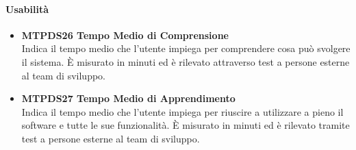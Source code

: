\paragraph{Usabilità}

\begin{itemize}

	\item\textbf{MTPDS26 Tempo Medio di Comprensione}\-\\
Indica il tempo medio che l'utente impiega per comprendere cosa può svolgere il sistema. È misurato in minuti ed è rilevato attraverso test a persone esterne al team di sviluppo.

	\item\textbf{MTPDS27 Tempo Medio di Apprendimento}\-\\
Indica il tempo medio che l'utente impiega per riuscire a utilizzare a pieno il software e tutte le sue funzionalità. È  misurato in minuti ed è rilevato tramite test a persone esterne al team di sviluppo. 

\end{itemize}

\iffalse
\paragraph{MTPDS25 Percentuale Commenti/Codice}\-\\
Indica le righe di commenti presente rispetto al codice. È  calcolato per ogni procedura e non per l'intera codebase. La misurazione avviene:
\begin{center}
	\item $PC = \frac{RC}{RT}*100$
\end{center}
dove PC è la percentuale calcolata, RC il numero di righe di commento e RT il numero di righe totale.
\fi


